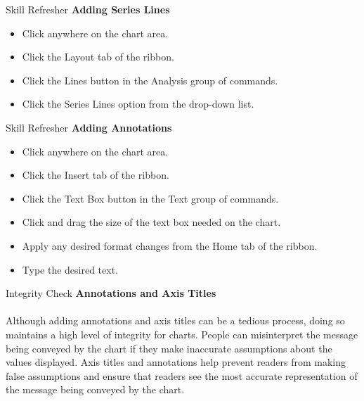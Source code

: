 \begin{center}
	\begin{sklbox}{Skill Refresher}
		\textbf{Adding Series Lines}
		\\
		\begin{itemize}
			\setlength{\itemsep}{0pt}
			\setlength{\parskip}{0pt}
			\setlength{\parsep}{0pt}
			
			\item Click anywhere on the chart area.
			\item Click the Layout tab of the ribbon.
			\item Click the Lines button in the Analysis group of commands.
			\item Click the Series Lines option from the drop-down list.
			
		\end{itemize}
	\end{sklbox}
\end{center}

\begin{center}
	\begin{sklbox}{Skill Refresher}
		\textbf{Adding Annotations}
		\\
		\begin{itemize}
			\setlength{\itemsep}{0pt}
			\setlength{\parskip}{0pt}
			\setlength{\parsep}{0pt}
			
			\item Click anywhere on the chart area.
			\item Click the Insert tab of the ribbon.
			\item Click the Text Box button in the Text group of commands.
			\item Click and drag the size of the text box needed on the chart.
			\item Apply any desired format changes from the Home tab of the ribbon.
			\item Type the desired text.
			
		\end{itemize}
	\end{sklbox}
\end{center}

\begin{center}
	\begin{infobox}{Integrity Check}
		\textbf{Annotations and Axis Titles}
		\\
		\\
		Although adding annotations and axis titles can be a tedious process, doing so maintains a high level of integrity for charts. People can misinterpret the message being conveyed by the chart if they make inaccurate assumptions about the values displayed. Axis titles and annotations help prevent readers from making false assumptions and ensure that readers see the most accurate representation of the message being conveyed by the chart.		
	\end{infobox}
\end{center}


